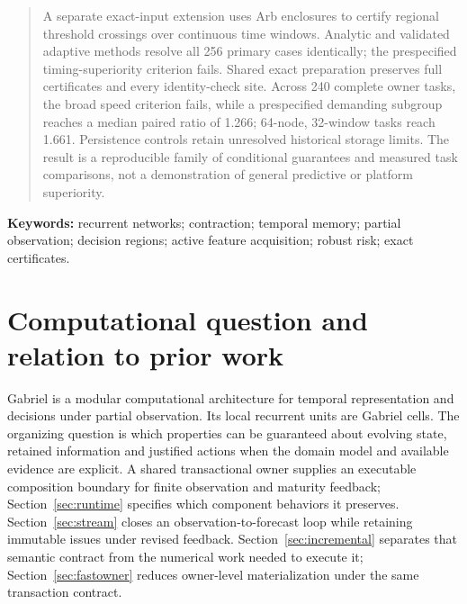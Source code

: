 \documentclass[11pt,a4paper]{article}
\renewenvironment{abstract}{\small\begin{center}\bfseries\abstractname\end{center}\begin{quote}\setlength{\parindent}{0pt}\setlength{\parskip}{4pt}}{\end{quote}}
\theoremstyle{definition}\newtheorem{definition}[theorem]{Definition}
\begin{document}
\begin{abstract}
A separate exact-input extension uses Arb enclosures to certify regional threshold crossings over continuous time windows. Analytic and validated adaptive methods resolve all 256 primary cases identically; the prespecified timing-superiority criterion fails. Shared exact preparation preserves full certificates and every identity-check site. Across 240 complete owner tasks, the broad speed criterion fails, while a prespecified demanding subgroup reaches a median paired ratio of 1.266; 64-node, 32-window tasks reach 1.661. Persistence controls retain unresolved historical storage limits. The result is a reproducible family of conditional guarantees and measured task comparisons, not a demonstration of general predictive or platform superiority.
\end{abstract}
{\small\textbf{Keywords:} recurrent networks; contraction; temporal memory; partial observation; decision regions; active feature acquisition; robust risk; exact certificates.}
\newpage
\begingroup
\footnotesize
\setcounter{tocdepth}{1}
\setlength{\parskip}{0pt}
\tableofcontents
\endgroup
\newpage

\section{Computational question and relation to prior work}
Gabriel is a modular computational architecture for temporal representation and decisions under partial observation. Its local recurrent units are Gabriel cells. The organizing question is which properties can be guaranteed about evolving state, retained information and justified actions when the domain model and available evidence are explicit. A shared transactional owner supplies an executable composition boundary for finite observation and maturity feedback; Section~\ref{sec:runtime} specifies which component behaviors it preserves. Section~\ref{sec:stream} closes an observation-to-forecast loop while retaining immutable issues under revised feedback. Section~\ref{sec:incremental} separates that semantic contract from the numerical work needed to execute it; Section~\ref{sec:fastowner} reduces owner-level materialization under the same transaction contract.
\end{document}

